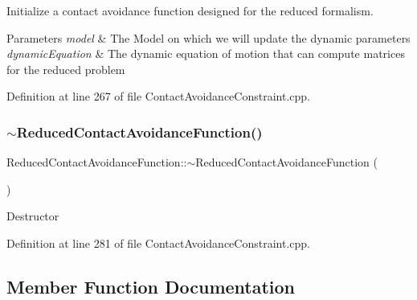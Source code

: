 Initialize a contact avoidance function designed for the reduced formalism.


\begin{DoxyParams}{Parameters}
{\em model} & The Model on which we will update the dynamic parameters \\
\hline
{\em dynamic\+Equation} & The dynamic equation of motion that can compute matrices for the reduced problem \\
\hline
\end{DoxyParams}


Definition at line 267 of file Contact\+Avoidance\+Constraint.\+cpp.

\hypertarget{classocra_1_1ReducedContactAvoidanceFunction_a7a1844143947f714f2e0207d9f56834a}{}\label{classocra_1_1ReducedContactAvoidanceFunction_a7a1844143947f714f2e0207d9f56834a} 
\subsubsection{\texorpdfstring{$\sim$\+Reduced\+Contact\+Avoidance\+Function()}{~ReducedContactAvoidanceFunction()}}
{\footnotesize\ttfamily Reduced\+Contact\+Avoidance\+Function\+::$\sim$\+Reduced\+Contact\+Avoidance\+Function (\begin{DoxyParamCaption}{ }\end{DoxyParamCaption})}

Destructor 

Definition at line 281 of file Contact\+Avoidance\+Constraint.\+cpp.



\subsection{Member Function Documentation}
\hypertarget{classocra_1_1ReducedContactAvoidanceFunction_ac39227a19a650de28f4ae603511bfb73}{}\label{classocra_1_1ReducedContactAvoidanceFunction_ac39227a19a650de28f4ae603511bfb73} 
